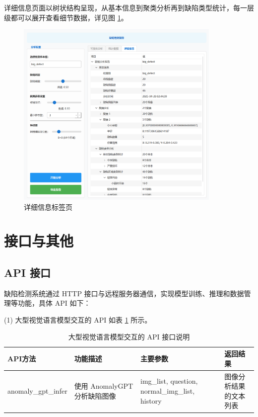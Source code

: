 \documentclass[
  ]{njuthesis}
\begin{document}
详细信息页面以树状结构呈现，从基本信息到聚类分析再到缺陷类型统计，每一层级都可以展开查看细节数据，详见图 \ref{详细信息标签页}。

\begin{figure}[H]
    \centering
    \includegraphics[width=0.88\textwidth]{images/详细信息标签页.png}
    \caption{详细信息标签页}
    \label{详细信息标签页}
\end{figure}

\section{接口与其他}

\subsection{API 接口}

缺陷检测系统通过 HTTP 接口与远程服务器通信，实现模型训练、推理和数据管理等功能，具体 API 如下：

(1) 大型视觉语言模型交互的 API 如表 \ref{AI_API} 所示。

\begin{table}[H]
    \centering
    \caption{大型视觉语言模型交互的 API 接口说明}
    \label{AI_API}
    \renewcommand\arraystretch{0.5}
    \begin{tabular}{p{2.5cm}p{3.5cm}p{4cm}p{2.5cm}}
    \toprule[1.5pt]
    API方法 & 功能描述 & 主要参数 & 返回结果 \\
    \midrule[1pt]
    anomaly\_gpt\_infer & 使用 AnomalyGPT 分析缺陷图像 & img\_list, question, normal\_img\_list, history & 图像分析结果的文本列表 \\
    \bottomrule[1.5pt]
    \end{tabular}
\end{table}
\end{document}
